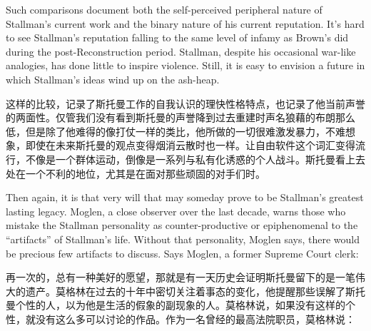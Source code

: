 \ifdefined\eng
Such comparisons document both the self-perceived peripheral nature of Stallman's current work and the binary nature of his current reputation. It's hard to see Stallman's reputation falling to the same level of infamy as Brown's did during the post-Reconstruction period. Stallman, despite his occasional war-like analogies, has done little to inspire violence. Still, it is easy to envision a future in which Stallman's ideas wind up on the ash-heap.
\fi

\ifdefined\chs
这样的比较，记录了斯托曼工作的自我认识的理快性格特点，也记录了他当前声誉的两面性。仅管我们没有看到斯托曼的声誉降到过去重建时声名狼藉的布朗那么低，但是除了他难得的像打仗一样的类比，他所做的一切很难激发暴力，不难想象，即使在未来斯托曼的观点变得烟消云散时也一样。让自由软件这个词汇变得流行，不像是一个群体运动，倒像是一系列与私有化诱惑的个人战斗。斯托曼看上去处在一个不利的地位，尤其是在面对那些顽固的对手们时。
\fi

\ifdefined\eng
Then again, it is that very will that may someday prove to be Stallman's greatest lasting legacy. Moglen, a close observer over the last decade, warns those who mistake the Stallman personality as counter-productive or epiphenomenal to the ``artifacts'' of Stallman's life. Without that personality, Moglen says, there would be precious few artifacts to discuss. Says Moglen, a former Supreme Court clerk:
\fi

\ifdefined\chs
再一次的，总有一种美好的愿望，那就是有一天历史会证明斯托曼留下的是一笔伟大的遗产。莫格林在过去的十年中密切关注着事态的变化，他提醒那些误解了斯托曼个性的人，以为他是生活的假象的副现象的人。莫格林说，如果没有这样的个性，就没有这么多可以讨论的作品。作为一名曾经的最高法院职员，莫格林说：
\fi

